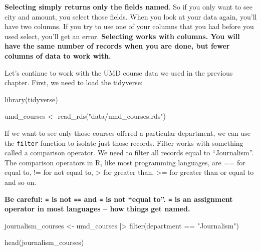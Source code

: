 \documentclass[
  letterpaper,
  DIV=11,
  numbers=noendperiod]{scrreprt}
\newenvironment{Shaded}{\begin{snugshade}}{\end{snugshade}}
\newcommand{\FunctionTok}[1]{\textcolor[rgb]{0.28,0.35,0.67}{#1}}
\newcommand{\NormalTok}[1]{\textcolor[rgb]{0.00,0.23,0.31}{#1}}
\newcommand{\OtherTok}[1]{\textcolor[rgb]{0.00,0.23,0.31}{#1}}
\newcommand{\SpecialCharTok}[1]{\textcolor[rgb]{0.37,0.37,0.37}{#1}}
\newcommand{\StringTok}[1]{\textcolor[rgb]{0.13,0.47,0.30}{#1}}
\begin{document}
\textbf{Selecting simply returns only the fields named}. So if you only
want to see city and amount, you select those fields. When you look at
your data again, you'll have two columns. If you try to use one of your
columns that you had before you used select, you'll get an error.
\textbf{Selecting works with columns. You will have the same number of
records when you are done, but fewer columns of data to work with.}

Let's continue to work with the UMD course data we used in the previous
chapter. First, we need to load the tidyverse:

\begin{Shaded}
\begin{Highlighting}[]
\FunctionTok{library}\NormalTok{(tidyverse)}
\end{Highlighting}
\end{Shaded}

\begin{Shaded}
\begin{Highlighting}[]
\NormalTok{umd\_courses }\OtherTok{\textless{}{-}} \FunctionTok{read\_rds}\NormalTok{(}\StringTok{"data/umd\_courses.rds"}\NormalTok{)}
\end{Highlighting}
\end{Shaded}

If we want to see only those courses offered a particular department, we
can use the \texttt{filter} function to isolate just those records.
Filter works with something called a comparison operator. We need to
filter all records equal to ``Journalism''. The comparison operators in
R, like most programming languages, are == for equal to, != for not
equal to, \textgreater{} for greater than, \textgreater= for greater
than or equal to and so on.

\textbf{Be careful: \texttt{=} is not \texttt{==} and \texttt{=} is not
``equal to''. \texttt{=} is an assignment operator in most languages --
how things get named.}

\begin{Shaded}
\begin{Highlighting}[]
\NormalTok{journalism\_courses }\OtherTok{\textless{}{-}}\NormalTok{ umd\_courses }\SpecialCharTok{|\textgreater{}} \FunctionTok{filter}\NormalTok{(department }\SpecialCharTok{==} \StringTok{"Journalism"}\NormalTok{)}

\FunctionTok{head}\NormalTok{(journalism\_courses)}
\end{Highlighting}
\end{Shaded}
\end{document}
